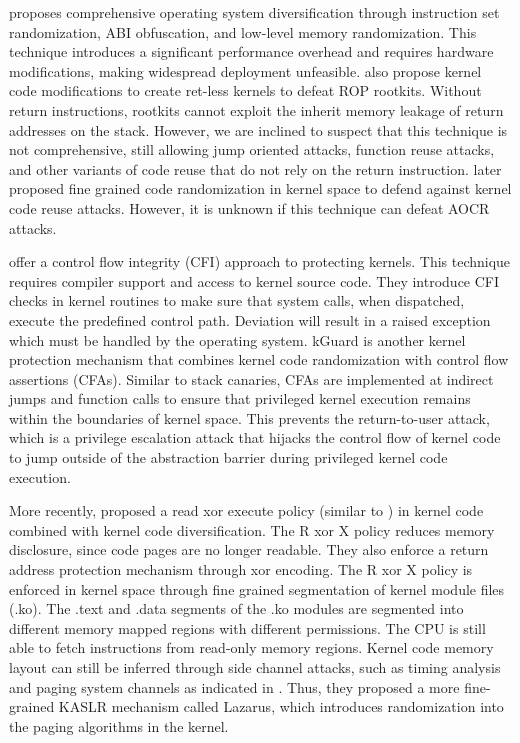 \documentclass[preprint,12pt]{elsarticle}
\begin{document}
\cite{jiang2007randsys} proposes comprehensive operating system diversification through instruction set randomization, ABI obfuscation, and low-level memory randomization. This technique introduces a significant performance overhead and requires hardware modifications, making widespread deployment unfeasible. \cite{li2010defeating} also propose kernel code modifications to create ret-less kernels to defeat ROP rootkits. Without return instructions, rootkits cannot exploit the inherit memory leakage of return addresses on the stack. However, we are inclined to suspect that this technique is not comprehensive, still allowing jump oriented attacks, function reuse attacks, and other variants of code reuse that do not rely on the return instruction. \cite{gionta2016preventing} later proposed fine grained code randomization in kernel space to defend against kernel code reuse attacks. However, it is unknown if this technique can defeat AOCR attacks.

\cite{criswell2014kcofi} offer a control flow integrity (CFI) approach to protecting kernels. This technique requires compiler support and access to kernel source code. They introduce CFI checks in kernel routines to make sure that system calls, when dispatched, execute the predefined control path. Deviation will result in a raised exception which must be handled by the operating system. kGuard \cite{kemerlis2012kguard} is another kernel protection mechanism that combines kernel code randomization with control flow assertions (CFAs). Similar to stack canaries, CFAs are implemented at indirect jumps and function calls to ensure that privileged kernel execution remains within the boundaries of kernel space. This prevents the return-to-user attack, which is a privilege escalation attack that hijacks the control flow of kernel code to jump outside of the abstraction barrier during privileged kernel code execution.

More recently, \cite{pomonis2017kr} proposed a read xor execute policy (similar to \cite{brookes2016exoshim}) in kernel code combined with kernel code diversification. The R xor X policy reduces memory disclosure, since code pages are no longer readable. They also enforce a return address protection mechanism through xor encoding. The R xor X policy is enforced in kernel space through fine grained segmentation of kernel module files (.ko). The .text and .data segments of the .ko modules are segmented into different memory mapped regions with different permissions. The CPU is still able to fetch instructions from read-only memory regions. Kernel code memory layout can still be inferred through side channel attacks, such as timing analysis and paging system channels as indicated in \cite{gens2017lazarus}. Thus, they proposed a more fine-grained KASLR mechanism called Lazarus, which introduces randomization into the paging algorithms in the kernel.
\end{document}
